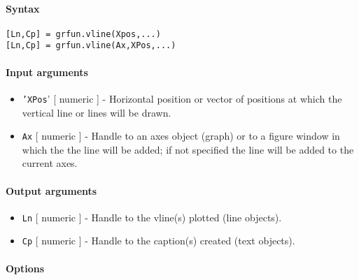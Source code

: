 


	\paragraph{Syntax}\label{syntax}

\begin{verbatim}
[Ln,Cp] = grfun.vline(Xpos,...)
[Ln,Cp] = grfun.vline(Ax,XPos,...)
\end{verbatim}

\paragraph{Input arguments}\label{input-arguments}

\begin{itemize}
\item
  \texttt{'XPos}' {[} numeric {]} - Horizontal position or vector of
  positions at which the vertical line or lines will be drawn.
\item
  \texttt{Ax} {[} numeric {]} - Handle to an axes object (graph) or to a
  figure window in which the the line will be added; if not specified
  the line will be added to the current axes.
\end{itemize}

\paragraph{Output arguments}\label{output-arguments}

\begin{itemize}
\item
  \texttt{Ln} {[} numeric {]} - Handle to the vline(s) plotted (line
  objects).
\item
  \texttt{Cp} {[} numeric {]} - Handle to the caption(s) created (text
  objects).
\end{itemize}

\paragraph{Options}\label{options}

